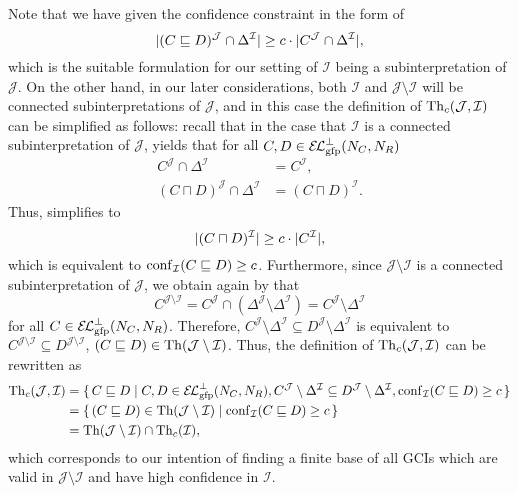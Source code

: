 Note that we have given the confidence constraint in the form of
\begin{equation}
  \label{eq:50}
  \lvert (C \sqsubseteq D)^{\mathcal{J}} \cap \Delta^{\mathcal{I}} \rvert \ge c \cdot \lvert
    C^{\mathcal{J}} \cap \Delta^{\mathcal{I}} \rvert,
\end{equation}
which is the suitable formulation for our setting of $\mathcal{I}$ being a
subinterpretation of $\mathcal{J}$.  On the other hand, in our later considerations, both
$\mathcal{I}$ and $\mathcal{J} \setminus \mathcal{I}$ will be connected subinterpretations
of $\mathcal{J}$, and in this case the definition of $\operatorname{Th}_{c}(\mathcal{J}, \mathcal{I})$
can be simplified as follows: recall that in the case that $\mathcal{I}$ is a connected
subinterpretation of $\mathcal{J}$,  yields that for all $C, D \in
\ELgfpbot(N_{C}, N_{R})$
\begin{align*}
  C^{\mathcal{J}} \cap \Delta^{\mathcal{I}} &= C^{\mathcal{I}}, \\
  (C \sqcap D)^{\mathcal{J}} \cap \Delta^{\mathcal{I}} &= (C \sqcap D)^{\mathcal{I}}.
\end{align*}
Thus,  simplifies to
\begin{equation*}
  \lvert (C \sqcap D)^{\mathcal{I}} \rvert \ge c \cdot \lvert C^{\mathcal{I}} \rvert,
\end{equation*}
which is equivalent to $\operatorname{conf}_{\mathcal{I}}( C \sqsubseteq D ) \ge c$.  Furthermore, since
$\mathcal{J} \setminus \mathcal{I}$ is a connected subinterpretation of $\mathcal{J}$, we
obtain again by  that
\begin{equation*}
  C^{\mathcal{J} \setminus \mathcal{I}} = C^{\mathcal{J}} \cap (\Delta^{\mathcal{J}}
  \setminus \Delta^{\mathcal{I}}) = C^{\mathcal{J}} \setminus \Delta^{\mathcal{I}}
\end{equation*}
for all $C \in \ELgfpbot(N_{C}, N_{R})$.  Therefore, $C^{\mathcal{J}} \setminus
\Delta^{\mathcal{I}} \subseteq D^{\mathcal{J}} \setminus \Delta^{\mathcal{I}}$ is
equivalent to $C^{\mathcal{J}\setminus\mathcal{I}} \subseteq
D^{\mathcal{J}\setminus\mathcal{I}}$, \ie $(C \sqsubseteq D) \in \operatorname{Th}(\mathcal{J} \setminus
\mathcal{I})$.  Thus, the definition of $\operatorname{Th}_{c}(\mathcal{J}, \mathcal{I})$ can be
rewritten as
\begin{align*}
  \Th_{c}(\mathcal{J}, \mathcal{I})
  &= \{\, C \sqsubseteq D \mid C, D \in \ELgfpbot(N_{C}, N_{R}),
  C^{\mathcal{J}} \setminus \Delta^{\mathcal{I}} \subseteq D^{\mathcal{J}}
  \setminus \Delta^{\mathcal{I}}, \conf_{\mathcal{I}}( C \sqsubseteq D ) \ge c \,\} \\
  &= \set{ (C \sqsubseteq D) \in \Th(\mathcal{J} \setminus \mathcal{I}) \mid
    \conf_{\mathcal{I}} (C \sqsubseteq D) \ge c } \\
  &= \Th(\mathcal{J} \setminus \mathcal{I}) \cap \Th_{c}(\mathcal{I}),
\end{align*}
which corresponds to our intention of finding a finite base of all GCIs which are valid in
$\mathcal{J} \setminus \mathcal{I}$ and have high confidence in $\mathcal{I}$.

